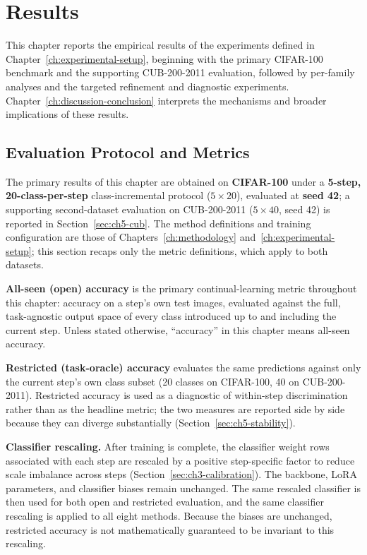 
\chapter{Results}
\label{ch:results}

This chapter reports the empirical results of the experiments defined in
Chapter~\ref{ch:experimental-setup}, beginning with the primary CIFAR-100
benchmark and the supporting CUB-200-2011 evaluation, followed by
per-family analyses and the targeted refinement and diagnostic
experiments. Chapter~\ref{ch:discussion-conclusion} interprets the
mechanisms and broader implications of these results.

\section{Evaluation Protocol and Metrics}
\label{sec:ch5-protocol}

The primary results of this chapter are obtained on \textbf{CIFAR-100}
under a \textbf{5-step, 20-class-per-step} class-incremental protocol
($5\times20$), evaluated at \textbf{seed 42}; a supporting second-dataset
evaluation on CUB-200-2011 ($5\times40$, seed 42) is reported in
Section~\ref{sec:ch5-cub}. The method definitions and training
configuration are those of Chapters~\ref{ch:methodology}
and~\ref{ch:experimental-setup}; this section recaps only the metric
definitions, which apply to both datasets.

\textbf{All-seen (open) accuracy} is the primary continual-learning metric
throughout this chapter: accuracy on a step's own test images, evaluated
against the full, task-agnostic output space of every class introduced up to
and including the current step. Unless stated otherwise, ``accuracy'' in
this chapter means all-seen accuracy.

\textbf{Restricted (task-oracle) accuracy} evaluates the same predictions
against only the current step's own class subset (20 classes on
CIFAR-100, 40 on CUB-200-2011). Restricted accuracy is used as a
diagnostic of within-step discrimination rather than as the headline
metric; the two measures are reported side by side because they can
diverge substantially (Section~\ref{sec:ch5-stability}).

\textbf{Classifier rescaling.} After training is complete, the classifier
weight rows associated with each step are rescaled by a positive
step-specific factor to reduce scale imbalance across steps
(Section~\ref{sec:ch3-calibration}). The backbone, LoRA parameters, and
classifier biases remain unchanged. The same rescaled classifier is then
used for both open and restricted evaluation, and the same classifier
rescaling is applied to all eight methods. Because the biases are
unchanged, restricted accuracy is not mathematically guaranteed to be
invariant to this rescaling.

